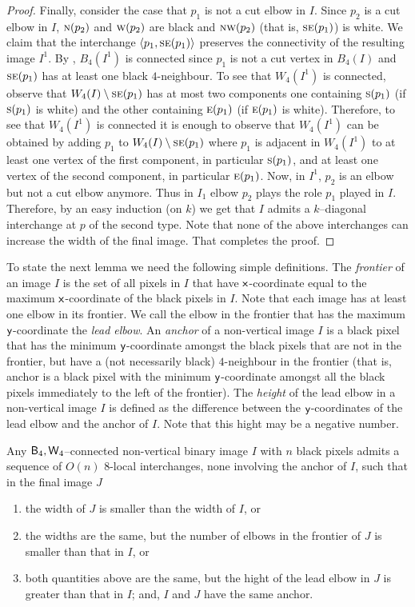 \documentclass[lotsofwhite,charterfonts]{patmorin}
\newcommand{\fourfour}{\ensuremath{\protect\textup{\textsf{B}}_{4},\protect\textup{\textsf{W}}_{4}}}
\newcommand{\N}{\textsc{n}}
\newcommand{\E}{\textsc{e}}
\newcommand{\SE}{\textsc{se}}
\renewcommand{\S}{\textsc{s}}
\newcommand{\W}{\textsc{w}}
\newcommand{\NW}{\textsc{nw}}
\newcommand{\x}{\ensuremath{\protect\textup{\textsf{x}}}}
\newcommand{\y}{\ensuremath{\protect\textup{\textsf{y}}}}
\newcommand{\ic}[2]{\langle #1,#2 \rangle}
\newcommand{\sm}{\ensuremath{\setminus}}
\begin{document}
\begin{proof}
Finally, consider the case that $p_1$ is not a cut elbow in $I$. Since $p_2$ is a cut elbow in $I$, $\N(p_2)$ and $\W(p_2)$ are black and $\NW(p_2)$ (that is, $\SE(p_1)$) is white. We claim that the interchange $\ic{p_1}{\SE(p_1)}$ preserves the connectivity of the resulting image $I^1$. By , $B_4(I^1)$ is connected since $p_1$ is not a cut vertex in $B_4(I)$ and $\SE(p_1)$ has at least one black $4$-neighbour. To see that $W_4(I^1)$ is connected, observe that $W_4(I)\sm \SE(p_1)$ has at most two components one containing $\S(p_1)$ (if $\S(p_1)$ is white) and the other containing $\E(p_1)$ (if $\E(p_1)$ is white). Therefore, to see that $W_4(I^1)$ is connected it is enough to observe that $W_4(I^1)$ can be obtained by adding $p_1$ to $W_4(I)\sm \SE(p_1)$ where $p_1$ is adjacent in $W_4(I^1)$ to at least one vertex of the first component, in particular $\S(p_1)$, and at least one vertex of the second component, in particular $\E(p_1)$. Now, in $I^1$, $p_2$ is an elbow but not a cut elbow anymore. Thus in $I_1$ elbow $p_2$ plays the role $p_1$ played in $I$. Therefore, by an easy induction (on $k$) we get that $I$ admits a $k$--diagonal interchange at $p$ of the second type. Note that none of the above interchanges can increase the width of the final image. That completes the proof.
\end{proof}

To state the next lemma we need the following simple definitions.  The \emph{frontier} of an image $I$ is the set of all pixels in $I$ that have \x-coordinate equal to the maximum \x-coordinate of the black pixels in $I$. Note that each image has at least one elbow in its frontier. We call the elbow in the frontier that has the maximum \y-coordinate the \emph{lead elbow}. An \emph{anchor} of a non-vertical image $I$ is a black pixel that has the minimum \y-coordinate amongst the black pixels that are not in the frontier, but have a (not necessarily black) $4$-neighbour in the frontier (that is, anchor is a black pixel with the minimum \y-coordinate amongst all the black pixels immediately to the left of the frontier). The \emph{height} of the lead elbow in a non-vertical image $I$ is defined as the difference between the \y-coordinates of the lead elbow and the anchor of $I$. Note that this hight may be a negative number.


\begin{lem}
Any \fourfour--connected non-vertical binary image $I$ with $n$ black pixels admits a sequence of $O(n)$ 8-local interchanges, none involving the anchor of $I$, such that in the final image $J$

\begin{enumerate}
\item the width of $J$ is smaller than the width of $I$, or 
\item the widths are the same, but the number of elbows in the frontier of $J$ is smaller than that in $I$, or
\item both quantities above are the same, but the hight of the lead elbow in $J$ is greater than that in $I$; and, $I$ and $J$ have the same anchor.
\end{enumerate}
\end{lem}
\end{document}
